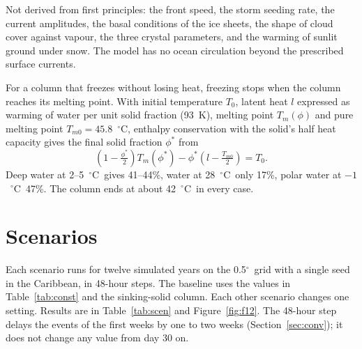 \documentclass[11pt,a4paper]{article}
\newcommand{\degC}{$^{\circ}$C}
\newcommand{\degree}{$^{\circ}$}
\begin{document}
Not derived from first principles: the front speed, the storm seeding rate, the current amplitudes, the basal conditions of the ice sheets, the shape of cloud cover against vapour, the three crystal parameters, and the warming of sunlit ground under snow. The model has no ocean circulation beyond the prescribed surface currents.

For a column that freezes without losing heat, freezing stops when the column reaches its melting point. With initial temperature $T_0$, latent heat $l$ expressed as warming of water per unit solid fraction (93~K), melting point $T_m(\phi)$ and pure melting point $T_{m0}=45.8$~\degC, enthalpy conservation with the solid's half heat capacity gives the final solid fraction $\phi^\ast$ from
\begin{equation}
\left(1-\tfrac{\phi^\ast}{2}\right)T_m(\phi^\ast) - \phi^\ast\left(l-\tfrac{T_{m0}}{2}\right) = T_0 .
\label{eq:stall}
\end{equation}
Deep water at 2--5~\degC\ gives 41--44\%, water at 28~\degC\ only 17\%, polar water at $-1$~\degC\ 47\%. The column ends at about 42~\degC\ in every case.

\section{Scenarios}
\label{sec:scen}

Each scenario runs for twelve simulated years on the 0.5\degree\ grid with a single seed in the Caribbean, in 48-hour steps. The baseline uses the values in Table~\ref{tab:const} and the sinking-solid column. Each other scenario changes one setting. Results are in Table~\ref{tab:scen} and Figure~\ref{fig:f12}. The 48-hour step delays the events of the first weeks by one to two weeks (Section~\ref{sec:conv}); it does not change any value from day 30 on.
\end{document}
